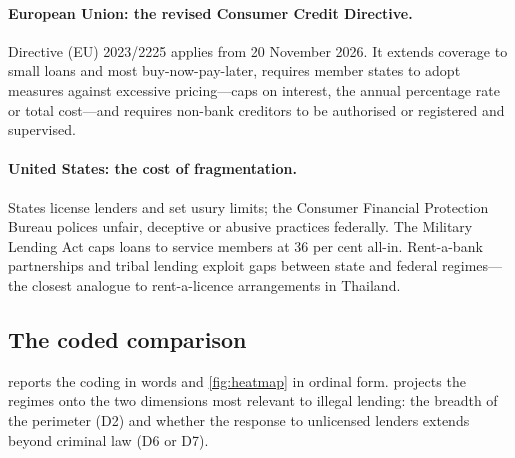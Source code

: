 \documentclass[11pt]{article}
\theoremstyle{plain}
\theoremstyle{definition}
\theoremstyle{remark}
\begin{document}
\paragraph{European Union: the revised Consumer Credit Directive.} Directive (EU) 2023/2225 applies from 20 November 2026. It extends coverage to small loans and most buy-now-pay-later, requires member states to adopt measures against excessive pricing---caps on interest, the annual percentage rate or total cost---and requires non-bank creditors to be authorised or registered and supervised.

\paragraph{United States: the cost of fragmentation.} States license lenders and set usury limits; the Consumer Financial Protection Bureau polices unfair, deceptive or abusive practices federally. The Military Lending Act caps loans to service members at 36 per cent all-in. Rent-a-bank partnerships and tribal lending exploit gaps between state and federal regimes---the closest analogue to rent-a-licence arrangements in Thailand.

\subsection{The coded comparison}

 reports the coding in words and \cref{fig:heatmap} in ordinal form.  projects the regimes onto the two dimensions most relevant to illegal lending: the breadth of the perimeter (D2) and whether the response to unlicensed lenders extends beyond criminal law (D6 or D7).
\end{document}
